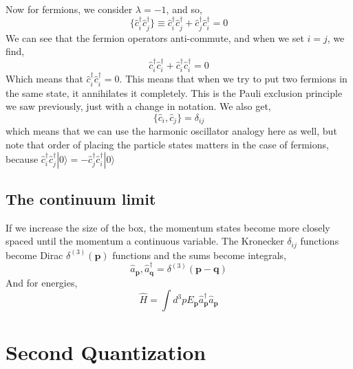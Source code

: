 Now for fermions, we consider $\lambda=-1$, and so,
\begin{equation}
    \{\hat{c}^\dagger_i\hat{c}^\dagger_j\}\equiv \hat{c}^\dagger_i\hat{c}^\dagger_j+\hat{c}^\dagger_j\hat{c}^\dagger_i=0
\end{equation}
We can see that the fermion operators anti-commute, and when we set $i=j$, we find,
\begin{equation}
    \hat{c}^\dagger_i\hat{c}^\dagger_i+\hat{c}^\dagger_i\hat{c}^\dagger_i=0
\end{equation}
Which means that $\hat{c}^\dagger_i\hat{c}^\dagger_i=0$. This means that when we try to put two fermions in the same state, it annihilates it completely. This is the Pauli exclusion principle we saw previously, just with a change in notation. We also get,
\begin{equation}
    \{\hat{c}_i,\hat{c}_j\}=\delta_{ij}
\end{equation}
which means that we can use the harmonic oscillator analogy here as well, but note that order of placing the particle states matters in the case of fermions, because $\hat{c}^\dagger_i\hat{c}^\dagger_j|0\rangle=-\hat{c}^\dagger_j\hat{c}^\dagger_i|0\rangle$
\subsection{The continuum limit}
If we increase the size of the box, the momentum states become more closely spaced until the momentum a continuous variable. The Kronecker $\delta_{ij}$ functions become Dirac $\delta^{(3)}(\textbf{p})$ functions and the sums become integrals,
\begin{equation}
    \hat{a}_{\textbf{p}},\hat{a}^\dagger_{\textbf{q}}=\delta^{(3)}(\textbf{p}-\textbf{q})
\end{equation}
And for energies,
\begin{equation}
    \hat{H}=\int d^3pE_{\textbf{p}}\hat{a}^\dagger_{\textbf{p}}\hat{a}_{\textbf{p}}
\end{equation}
\section{Second Quantization}
